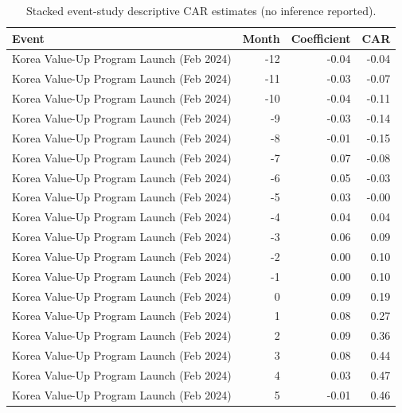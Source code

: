 \begin{table}
\caption{Stacked event-study descriptive CAR estimates (no inference reported).}
\label{tab:event_study_coefs}
\begin{tabular}{lrrr}
\toprule
Event & Month & Coefficient & CAR \\
\midrule
Korea Value-Up Program Launch (Feb 2024) & -12 & -0.04 & -0.04 \\
Korea Value-Up Program Launch (Feb 2024) & -11 & -0.03 & -0.07 \\
Korea Value-Up Program Launch (Feb 2024) & -10 & -0.04 & -0.11 \\
Korea Value-Up Program Launch (Feb 2024) & -9 & -0.03 & -0.14 \\
Korea Value-Up Program Launch (Feb 2024) & -8 & -0.01 & -0.15 \\
Korea Value-Up Program Launch (Feb 2024) & -7 & 0.07 & -0.08 \\
Korea Value-Up Program Launch (Feb 2024) & -6 & 0.05 & -0.03 \\
Korea Value-Up Program Launch (Feb 2024) & -5 & 0.03 & -0.00 \\
Korea Value-Up Program Launch (Feb 2024) & -4 & 0.04 & 0.04 \\
Korea Value-Up Program Launch (Feb 2024) & -3 & 0.06 & 0.09 \\
Korea Value-Up Program Launch (Feb 2024) & -2 & 0.00 & 0.10 \\
Korea Value-Up Program Launch (Feb 2024) & -1 & 0.00 & 0.10 \\
Korea Value-Up Program Launch (Feb 2024) & 0 & 0.09 & 0.19 \\
Korea Value-Up Program Launch (Feb 2024) & 1 & 0.08 & 0.27 \\
Korea Value-Up Program Launch (Feb 2024) & 2 & 0.09 & 0.36 \\
Korea Value-Up Program Launch (Feb 2024) & 3 & 0.08 & 0.44 \\
Korea Value-Up Program Launch (Feb 2024) & 4 & 0.03 & 0.47 \\
Korea Value-Up Program Launch (Feb 2024) & 5 & -0.01 & 0.46 \\

\end{tabular}
\end{table}
